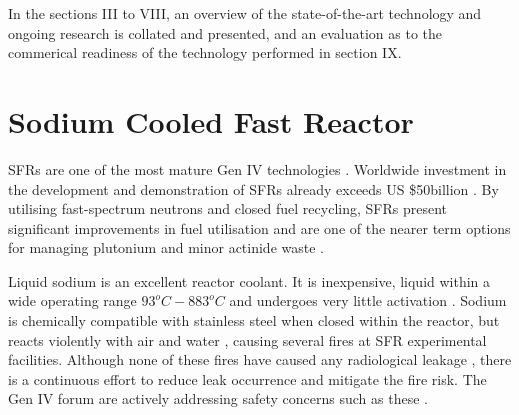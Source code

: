 \documentclass[journal]{IEEEtran}
\begin{document}
In the sections III to VIII, an overview of the state-of-the-art technology and ongoing research is collated and presented, and an evaluation as to the commerical readiness of the technology performed in section IX.


\section{Sodium Cooled Fast Reactor}
SFRs are one of the most mature Gen IV technologies \cite{Marques2010a}. 
Worldwide investment in the development and demonstration of SFRs already exceeds US \$50billion \cite{Int2012}. 
By utilising fast-spectrum neutrons and closed fuel recycling, SFRs present significant improvements in fuel utilisation and are one of the nearer term options for managing plutonium and minor actinide waste \cite{GenIVForum}.

Liquid sodium is an excellent reactor coolant. 
It is inexpensive, liquid within a wide operating range $93^{o}C-883^{o}C$ and undergoes very little activation \cite{Sakamoto2013194}. 
Sodium is chemically compatible with stainless steel when closed within the reactor, but reacts violently with air and water \cite{Sakamoto2013194}, causing several fires at SFR experimental facilities.
Although none of these fires have caused any radiological leakage \cite{Int2012}, there is a continuous effort to reduce leak occurrence and mitigate the fire risk. 
The Gen IV forum are actively addressing safety concerns such as these \cite{GenIVRoadmap}.
\end{document}
